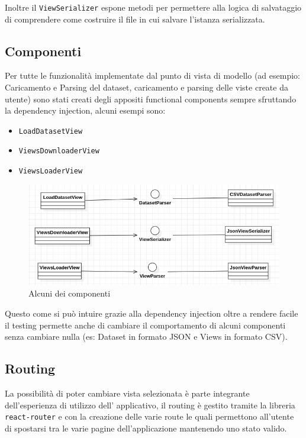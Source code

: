 Inoltre il \texttt{ViewSerializer} espone metodi per permettere alla logica di salvataggio
di comprendere come costruire il file in cui salvare l'istanza serializzata.

\subsection{Componenti}
Per tutte le
funzionalità implementate dal punto di vista di modello (ad esempio: Caricamento e Parsing
del dataset, caricamento e parsing delle viste create da utente) sono stati creati degli
appositi functional components sempre sfruttando la dependency injection, alcuni esempi sono:
\begin{itemize}
  \item \texttt{LoadDatasetView}
  \item \texttt{ViewsDownloaderView}
  \item \texttt{ViewsLoaderView}
\end{itemize}

\begin{figure}[h!]
  \centering
  \includegraphics[scale=0.55]{../../assets/classi_uml/components.png}
  \caption{Alcuni dei componenti}
\end{figure}

Questo come si può intuire grazie alla dependency injection oltre a rendere
facile il testing permette anche di cambiare il comportamento di alcuni componenti
senza cambiare nulla (es: Dataset in formato JSON e Views in formato CSV).

\subsection{Routing}
La possibilità di poter cambiare vista selezionata è parte integrante dell'esperienza
di utilizzo dell' applicativo, il routing è gestito tramite la libreria
\texttt{react-router} e con la creazione delle varie route le quali permettono all'utente di
spostarsi tra le varie pagine dell'applicazione mantenendo uno stato valido.

